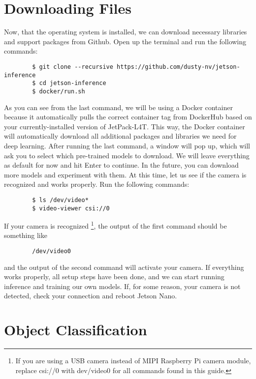 \documentclass[letter, 12pt]{article}
\begin{document}
	\section{Downloading Files}
	\noindent Now, that the operating system is installed, we can download necessary libraries and support packages from Github. Open up the terminal and run the following commands:
	\begin{verbatim}
		$ git clone --recursive https://github.com/dusty-nv/jetson-inference
		$ cd jetson-inference
		$ docker/run.sh
	\end{verbatim}
	\noindent As you can see from the last command, we will be using a Docker container because it automatically pulls the correct container tag from DockerHub based on your currently-installed version of JetPack-L4T. This way, the Docker container will automatically download all additional packages and libraries we need for deep learning. After running the last command, a window will pop up, which will ask you to select which pre-trained models to download. We will leave everything as default for now and hit Enter to continue. In the future, you can download more models and experiment with them. At this time, let us see if the camera is recognized and works properly. Run the following commands:
	\begin{verbatim}
		$ ls /dev/video*
		$ video-viewer csi://0
	\end{verbatim}
	\noindent If your camera is recognized \footnote{If you are using a USB camera instead of MIPI Raspberry Pi camera module, replace csi://0 with dev/video0 for all commands found in this guide.}, the output of the first command should be something like
	\begin{verbatim}
		/dev/video0
	\end{verbatim}
	\noindent and the output of the second command will activate your camera. If everything works properly, all setup steps have been done, and we can start running inference and training our own models. If, for some reason, your camera is not detected, check your connection and reboot Jetson Nano. 
	
	\section{Object Classification}
\end{document}
